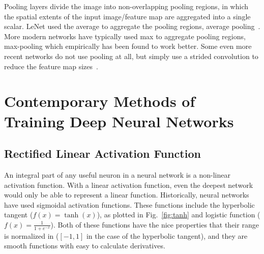 \documentclass[thesis]{subfiles}
\begin{document}
Pooling layers divide the image into non-overlapping pooling regions, in which the spatial extents of the input image/feature map are aggregated into a single scalar. LeNet used the average to aggregate the pooling regions, \ie average pooling~\citep{Lecun1998}. More modern networks have typically used max to aggregate pooling regions, \ie max-pooling which empirically has been found to work better. Some even more recent networks do not use pooling at all, but simply use a strided convolution to reduce the feature map sizes~\citep{He2015}.

\section{Contemporary Methods of Training Deep Neural Networks}
\label{section:contemporary}
\subsection{Rectified Linear Activation Function}
\label{section:relu}
An integral part of any useful neuron in a neural network is a non-linear activation function. With a linear activation function, even the deepest network would only be able to represent a linear function. Historically, neural networks have used sigmoidal activation functions. These functions include the hyperbolic tangent ($f(x) = \tanh(x)$), as plotted in Fig.~\ref{fig:tanh} and logistic function ($f(x) = \frac{1}{1+e^{-x}}$). Both of these functions have the nice properties that their range is normalized in ($[-1,1]$ in the case of the hyperbolic tangent), and they are smooth functions with easy to calculate derivatives.
\end{document}
